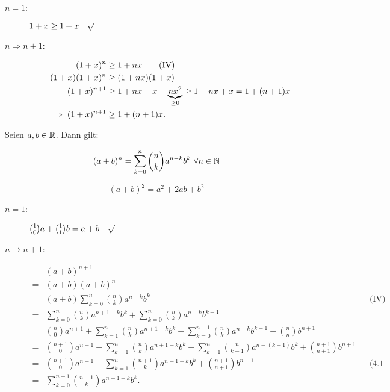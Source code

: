 \documentclass[a4paper,twoside,DIV15,BCOR12mm]{scrbook}
\begin{document}
\begin{beweis}
\begin{description}
\item[$n=1$:] $1+x\ge1+x\quad\surd$
\item[$n\Rightarrow n+1$:]
\begin{align*}
(1+x)^n&\ge1+nx\qquad\text{(IV)}\\
(1+x)(1+x)^n&\ge(1+nx)(1+x)\\
(1+x)^{n+1}&\ge1+nx+x+\underbrace{nx^2}_{\ge0}\ge1+nx+x=1+(n+1)x\\
\implies(1+x)^{n+1}&\ge1+(n+1)x\text{.}
\end{align*}
\end{description}
\end{beweis}

\begin{satz}
Seien $a,b\in\mathbb{R}$. Dann gilt:

\begin{displaymath}
(a+b)^n=\sum_{k=0}^n{\binom{n}{k}a^{n-k}b^k}\ \forall n\in\MdN
\end{displaymath}
\end{satz}

\begin{beispiel}
$$(a+b)^2=a^2+2ab+b^2$$
\end{beispiel}

\begin{beweis}
\begin{description}
\item[$n=1$:] $\binom{1}{0}a+\binom{1}{1}b=a+b\quad\surd$
\item[$n\longrightarrow n+1$:]
\begin{align*}
&(a+b)^{n+1}\\
=&(a+b)(a+b)^n\\
=&(a+b)\sum_{k=0}^n{\binom{n}{k}a^{n-k}b^k} && \text{(IV)}\\
=&\sum_{k=0}^n{\binom{n}{k}a^{n+1-k}b^k}+\sum_{k=0}^n{\binom{n}{k}a^{n-k}b^{k+1}}\\
=&\binom{n}{0}a^{n+1}+\sum_{k=1}^n{\binom{n}{k}a^{n+1-k}b^k}+\sum_{k=0}^{n-1}{\binom{n}{k}a^{n-k}b^{k+1}}+\binom{n}{n}b^{n+1}\\
=&\binom{n+1}{0}a^{n+1}+\sum_{k=1}^n{\binom{n}{k}a^{n+1-k}b^k}+\sum_{k=1}^{n}{\binom{n}{k-1}a^{n-(k-1)}b^{k}}+\binom{n+1}{n+1}b^{n+1}\\
=&\binom{n+1}{0}a^{n+1}+\sum_{k=1}^n{\binom{n+1}{k}a^{n+1-k}b^k}+\binom{n+1}{n+1}b^{n+1} && \text{(4.1 (2))}\\
=&\sum_{k=0}^{n+1}{\binom{n+1}{k}a^{n+1-k}b^k}\text{.}\\
\end{align*}
\end{description}
\end{beweis}
\end{document}
